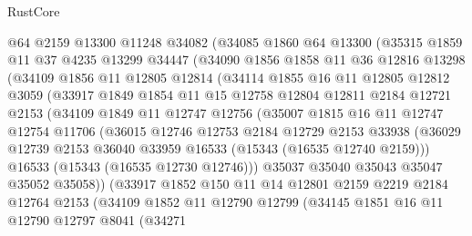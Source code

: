 \begin{lexlean}{RustCore}
\begin{coremodule}
        @64
        @2159
        @13300
        @11248
        @34082
        (@34085
          @1860
          @64
          @13300
          (@35315
            @1859
            @11
            @37
            @4235
            @13299
            @34447
            (@34090
              @1856
              @1858
              @11
              @36
              @12816
              @13298
              (@34109
                @1856
                @11
                @12805
                @12814
                (@34114
                  @1855
                  @16
                  @11
                  @12805
                  @12812
                  @3059
                  (@33917
                    @1849
                    @1854
                    @11
                    @15
                    @12758
                    @12804
                    @12811
                    @2184
                    @12721
                    @2153
                    (@34109
                      @1849
                      @11
                      @12747
                      @12756
                      (@35007
                        @1815
                        @16
                        @11
                        @12747
                        @12754
                        @11706
                        (@36015
                          @12746
                          @12753
                          @2184
                          @12729
                          @2153
                          @33938
                          (@36029 @12739 @2153 @36040 @33959 @16533 (@15343 (@16535 @12740 @2159)))
                          @16533
                          (@15343 (@16535 @12730 @12746)))
                        @35037
                        @35040
                        @35043
                        @35047
                        @35052
                        @35058))
                    (@33917
                      @1852
                      @150
                      @11
                      @14
                      @12801
                      @2159
                      @2219
                      @2184
                      @12764
                      @2153
                      (@34109
                        @1852
                        @11
                        @12790
                        @12799
                        (@34145
                          @1851
                          @16
                          @11
                          @12790
                          @12797
                          @8041
                          (@34271

\end{coremodule}
\end{lexlean}
